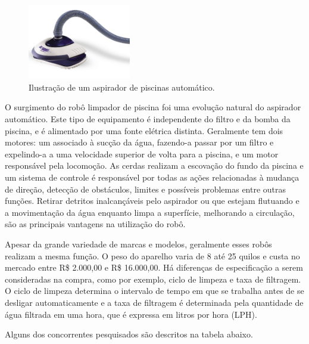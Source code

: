 \begin{figure}[h]
    \centering
    \includegraphics[width=0.4\textwidth]{figures/limpa_piscina_auto.png}
    \caption{Ilustração de um aspirador de piscinas automático. \cite{pentair2012}}
    \label{fig:schema-way-robot}
  \end{figure}

O surgimento do robô limpador de piscina foi uma evolução natural do aspirador 
automático. Este tipo de equipamento é independente do filtro e da bomba da 
piscina, e é alimentado por uma fonte elétrica distinta. Geralmente tem dois 
motores: um associado à sucção da água, fazendo-a passar por um filtro e 
expelindo-a a uma velocidade superior de volta para a piscina, e um motor 
responsável pela locomoção. As cerdas realizam a escovação do fundo da piscina 
e um sistema de controle é responsável por todas as ações relacionadas à 
mudança de direção, detecção de obstáculos, limites e possíveis problemas entre
outras funções. Retirar detritos inalcançáveis pelo aspirador ou que estejam flutuando
e a movimentação da água enquanto limpa a superfície, melhorando a circulação, são
as principais vantagens na utilização do robô.
 
Apesar da grande variedade de marcas e modelos, geralmente esses robôs realizam
a mesma função. O peso do aparelho varia de 8 até 25 quilos e  custa no mercado
entre  R\$ 2.000,00 e  R\$ 16.000,00. Há diferenças de especificação a serem 
consideradas na compra, como por exemplo, ciclo de limpeza e taxa de filtragem. 
O ciclo de limpeza determina o intervalo de tempo em que se trabalha antes de se desligar automaticamente e a taxa de filtragem é determinada pela quantidade de água filtrada em uma 
hora, que é expressa em litros por hora (LPH).

Alguns dos concorrentes pesquisados são descritos na tabela abaixo.

